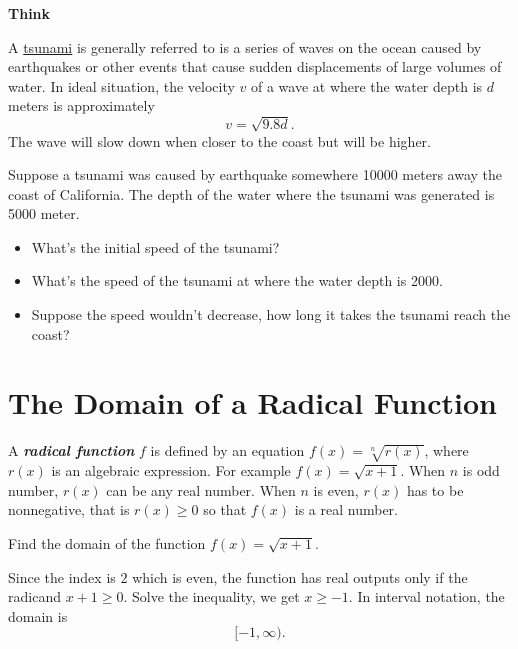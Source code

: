 \documentclass[en,12pt]{elegantbook}
\providecommand{\tightlist}{%
  \setlength{\itemsep}{0pt}\setlength{\parskip}{0pt}}
\newenvironment{rmdthink}{
	\par\noindent
	{
		\makebox[-\width][r]{
			\footnotesize
			\color{green!90}\faLightbulbO
			\hspace*{3pt}
		}
			\textbf{
				\color{second}
				Think 
			}
    }
    \begin{shaded}
    \sffamily
}{
    \par\medskip\ignorespacesafterend
    \end{shaded}
}
\providecommand{\tightlist}{%
  \setlength{\itemsep}{0pt}\setlength{\parskip}{0pt}}
\let\BeginKnitrBlock\begin \let\EndKnitrBlock\end
\begin{document}
\begin{rmdthink}

A \href{https://en.wikipedia.org/wiki/Tsunami}{tsunami} is generally referred to is a series of waves on the ocean caused by earthquakes or other events that cause sudden displacements of large volumes of water. In ideal situation, the velocity \(v\) of a wave at where the water depth is \(d\) meters is approximately
\[
v=\sqrt{9.8d}.
\]
The wave will slow down when closer to the coast but will be higher.

Suppose a tsunami was caused by earthquake somewhere 10000 meters away the coast of California. The depth of the water where the tsunami was generated is 5000 meter.

\begin{itemize}
\tightlist
\item
  What's the initial speed of the tsunami?
\item
  What's the speed of the tsunami at where the water depth is 2000.
\item
  Suppose the speed wouldn't decrease, how long it takes the tsunami reach the coast?
\end{itemize}

\end{rmdthink}

\hypertarget{the-domain-of-a-radical-function}{%
\section{The Domain of a Radical Function}\label{the-domain-of-a-radical-function}}

A \textbf{\emph{radical function}} \(f\) is defined by an equation \(f(x)=\sqrt[n]{r(x)}\), where \(r(x)\) is an algebraic expression. For example \(f(x)=\sqrt{x+1}\). When \(n\) is odd number, \(r(x)\) can be any real number. When \(n\) is even, \(r(x)\) has to be nonnegative, that is \(r(x)\geq 0\) so that \(f(x)\) is a real number.

\BeginKnitrBlock{example}
\protect\hypertarget{exm:unnamed-chunk-273}{}{\label{exm:unnamed-chunk-273} }
Find the domain of the function \(f(x)=\sqrt{x+1}\).
\EndKnitrBlock{example}

\BeginKnitrBlock{solution}


Since the index is \(2\) which is even, the function has real outputs only if the radicand \(x+1\geq 0\).
Solve the inequality, we get \(x\geq -1\). In interval notation, the domain is
\[
[-1,\infty).
\]
\EndKnitrBlock{solution}
\end{document}
